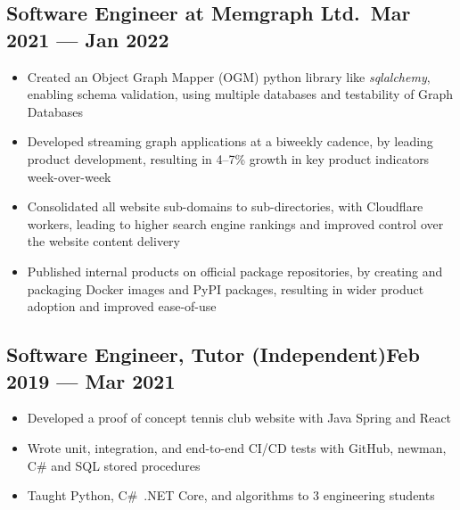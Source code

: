 \documentclass{article}
\begin{document}
\subsection{Software Engineer at Memgraph Ltd.\ \hfill Mar 2021 --- Jan 2022}
\begin{itemize}
  \itemsep0em
  \item Created an Object Graph Mapper (OGM) python library like \textit{sqlalchemy}, enabling schema validation, using multiple databases and testability of Graph Databases
  \item Developed streaming graph applications at a biweekly cadence, by leading product development, resulting in 4--7\% growth in key product indicators week-over-week
  \item Consolidated all website sub-domains to sub-directories, with Cloudflare workers, leading to higher search engine rankings and improved control over the website content delivery
  \item Published internal products on official package repositories, by creating and packaging Docker images and PyPI packages, resulting in wider product adoption and improved ease-of-use
\end{itemize}

\subsection{Software Engineer, Tutor (Independent)\hfill Feb 2019 --- Mar 2021}
\begin{itemize}
  \itemsep0em
  \item Developed a proof of concept tennis club website with Java Spring and React
  \item Wrote unit, integration, and end-to-end CI/CD tests with GitHub, newman, C\# and SQL stored procedures
  \item Taught Python, C\#~.NET Core, and algorithms to 3 engineering students
\end{itemize}
\end{document}
